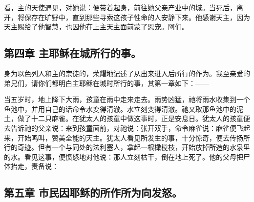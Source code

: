 看，主的天使遇见，对她说：便带着起身，前往她父亲产业中的城。当死后，离开，将保存在旷野中，直到那些寻索这孩子性命的人安静下来。他感谢天主，因为天主赐给了他智慧，也因他在上主天主面前蒙了恩宠。阿们。\par


\subsection{第四章 主耶稣在城所行的事。}

身为以色列人和主的宗徒的，荣耀地记述了从出来进入后所行的作为。我至亲爱的弟兄们，请你们都明白主耶稣在城时所行的事，其第一章如下：——\par

当五岁时，地上降下大雨，孩童在雨中走来走去。雨势凶猛，祂将雨水收集到一个鱼池中，并用自己的话命令水变得清澈。水立刻变得清澈。祂又取那鱼池中的泥土，做了十二只麻雀。在犹太人的孩童中做这事时，正是安息日。犹太人的孩童便去告诉祂的父亲说：来到孩童面前，对祂说：张开双手，命令麻雀说：麻雀便飞起来，开始鸣叫，赞美全能的天主。犹太人看见所发生的事，十分惊奇，便去传扬所行的奇迹。但有一个与同处的法利塞人，拿起一根橄榄枝，开始放掉所造的水泉里的水。看见这事，便愤怒地对他说：那人立刻枯干，倒在地上死了。他的父母把尸体抬走，责备说：\par


\subsection{第五章 市民因耶稣的所作所为向发怒。}

